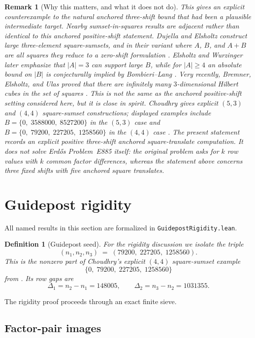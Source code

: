 \documentclass[11pt]{article}
\theoremstyle{plainbreak}
\theoremstyle{defbreak}
\newtheorem{definition}[theorem]{Definition}
\newtheorem{remark}[theorem]{Remark}
\begin{document}
\begin{remark}[Why this matters, and what it does not do]
This gives an explicit counterexample to the natural anchored three-shift
bound that had been a plausible intermediate target.
Nearby sumset-in-squares results are adjacent rather than identical to
this anchored positive-shift statement.
Dujella and Elsholtz construct large three-element square-sumsets, and in
their variant where $A$, $B$, and $A+B$ are all squares they reduce to a
zero-shift formulation \cite{DuEl13}.
Elsholtz and Wurzinger later emphasize that $|A|=3$ can support large
$B$, while for $|A|\ge 4$ an absolute bound on $|B|$ is conjecturally
implied by Bombieri--Lang \cite{ElWu24}.
Very recently, Bremner, Elsholtz, and Ulas proved that there are
infinitely many $3$-dimensional Hilbert cubes in the set of squares
\cite{BeElUl26}. This is not the same as the anchored positive-shift
setting considered here, but it is close in spirit.
Choudhry gives explicit $(5,3)$ and $(4,4)$ square-sumset constructions;
displayed examples include
$B=\{0,\;3588000,\;8527200\}$ in the $(5,3)$ case and
$B=\{0,\;79200,\;227205,\;1258560\}$ in the $(4,4)$ case \cite{Cho25}.
The present statement records an explicit positive three-shift anchored
square-translate computation.
It does \emph{not} solve Erd\H{o}s Problem~E885 itself:
the original problem asks for $k$ row values with $k$ common
factor differences, whereas the statement above concerns three fixed
shifts with five anchored square translates.
\end{remark}

\section{Guidepost rigidity}

All named results in this section are formalized in
\texttt{GuidepostRigidity.lean}.

\begin{definition}[Guidepost seed]
For the rigidity discussion we isolate the triple
\[
  (n_1,n_2,n_3) \;=\; (79200,\;227205,\;1258560).
\]
This is the nonzero part of Choudhry's explicit $(4,4)$ square-sumset
example
\[
  \{0,\;79200,\;227205,\;1258560\}
\]
from \cite{Cho25}.
Its row gaps are
\[
  \Delta_1 = n_2-n_1 = 148005,
  \qquad
  \Delta_2 = n_3-n_2 = 1031355.
\]
\end{definition}

The rigidity proof proceeds through an exact finite sieve.

\subsection{Factor-pair images}
\end{document}
